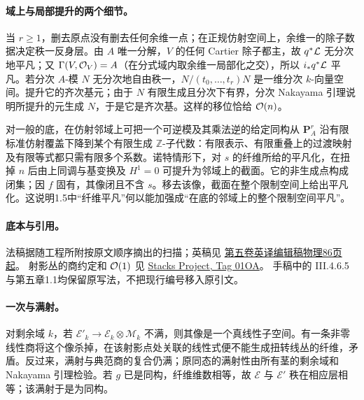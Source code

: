\paragraph{域上与局部提升的两个细节。}
当 \(r\ge1\)，删去原点没有删去任何余维一点；在正规仿射空间上，余维一的除子数据决定秩一反身层。由 \(A\) 唯一分解，\(V\) 的任何 Cartier 除子都主，故 \(q^*\LL\) 无分次地平凡；又 \(\Gamma(V,\OO_V)=A\)（在分式域内取余维一局部化之交），所以 \(i_*q^*\LL\) 平凡。若分次 \(A\)-模 \(N\) 无分次地自由秩一，\(N/(t_0,\ldots,t_r)N\) 是一维分次 \(k\)-向量空间。提升它的齐次基元；由于 \(N\) 有限生成且分次下有界，分次 Nakayama 引理说明所提升的元生成 \(N\)，于是它是齐次基。这样的移位恰给 \(\OO(n)\)。

对一般的底，在仿射邻域上可把一个可逆模及其乘法逆的给定同构从 \(\mathbf P_A^r\) 沿有限标准仿射覆盖下降到某个有限生成 \(\mathbb Z\)-子代数：有限表示、有限重叠上的过渡映射及有限等式都只需有限多个系数。诺特情形下，对 \(s\) 的纤维所给的平凡化，在扭掉 \(n\) 后由上同调与基变换及 \(H^1=0\) 可提升为邻域上的截面。它的非生成点构成闭集；因 \(f\) 固有，其像闭且不含 \(s\)。移去该像，截面在整个限制空间上给出平凡化。这说明1.5中“纤维平凡”何以能加强成“在底的邻域上的整个限制空间平凡”。

\paragraph{底本与引用。}
法稿据随工程所附按原文顺序摘出的扫描；英稿见
\href{https://webusers.imj-prg.fr/~leila.schneps/grothendieckcircle/EGA/EGA5trans.pdf#page=86}{第五卷英译编辑稿物理86页起}。
射影丛的商约定和 \(\OO(1)\) 见
\href{https://stacks.math.columbia.edu/tag/01OA}{Stacks Project, Tag 01OA}。
手稿中的 III.4.6.5 与第五章1.1均保留原写法，不把现行编号移入原引文。
\par\endgroup

\begingroup
\def\OO{\mathcal O}
\def\LL{\mathcal L}
\def\MM{\mathcal M}
\def\EE{\mathcal E}
\def\Pic{\operatorname{Pic}}
\def\Sym{\operatorname{Sym}}
\def\Spec{\operatorname{Spec}}
\def\Aut{\operatorname{Aut}}
\def\End{\operatorname{End}}
\def\Div{\operatorname{Div}}
\hypertarget{audit:L18-074}{}
\paragraph{一次与满射。}
对剩余域 \(k\)，若 \(\EE'_k\to\EE_k\otimes\MM_k\) 不满，则其像是一个真线性子空间。有一条非零线性商将这个像杀掉，在该射影点处关联的线性式便不能生成扭转线丛的纤维，矛盾。反过来，满射与典范商的复合仍满；原同态的满射性由所有茎的剩余域和 Nakayama 引理检验。若 \(g\) 已是同构，纤维维数相等，故 \(\EE\) 与 \(\EE'\) 秩在相应层相等；该满射于是为同构。

